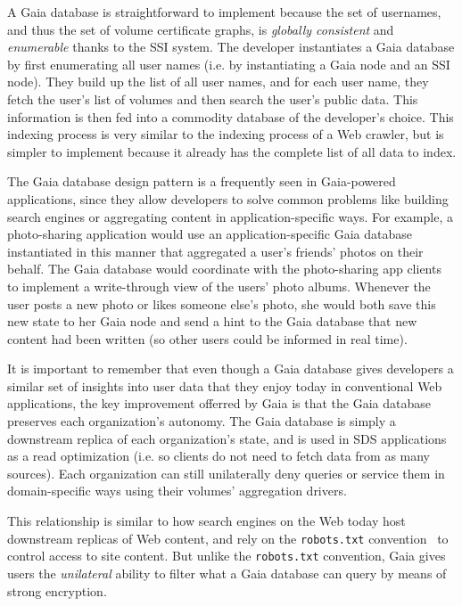 A Gaia database is straightforward to
implement because the set of usernames, and thus the set of volume certificate
graphs, is \emph{globally consistent} and \emph{enumerable} thanks to the SSI
system.  The developer instantiates a Gaia database by first
enumerating all user names (i.e. by instantiating a Gaia node and
an SSI node).  They build up the list of all user names, and for each user name,
they fetch the user's list of volumes and then search the user's public data.
This information is then fed into a commodity database of the developer's
choice.  This indexing process is very similar to the indexing process of a Web
crawler, but is simpler to implement because it already has the complete list of
all data to index.

The Gaia database design pattern is a frequently seen in Gaia-powered applications,
since they allow developers to solve common problems like building search
engines or aggregating content in application-specific ways.  For example, 
a photo-sharing application would use
an application-specific Gaia database instantiated in this manner that
aggregated a user's friends' photos on their behalf.  The Gaia database
would coordinate with the photo-sharing app clients to implement a write-through view of
the users' photo albums.  Whenever the user posts a new photo or likes someone else's
photo, she would both save this new state to her Gaia node and send a hint
to the Gaia database that new content had been written (so other users could
be informed in real time).

It is important to remember that even though a Gaia database gives
developers a similar set of insights into user data that they enjoy today in
conventional Web applications, the key improvement offerred by Gaia is that 
the Gaia database preserves each
organization's autonomy.  The Gaia database is simply a downstream replica of
each organization's state, and is used in SDS applications as a read optimization
(i.e. so clients do not need to fetch data from as many sources).
Each organization can still unilaterally deny queries or service them in
domain-specific ways using their volumes' aggregation drivers.

This relationship is similar to how search engines on the Web today host downstream
replicas of Web content, and rely on the \texttt{robots.txt}
convention~\cite{robots-txt-convention} to control access to site content.
But unlike the \texttt{robots.txt} convention, Gaia gives users the
\emph{unilateral} ability to filter what a Gaia database can query by means of
strong encryption.


